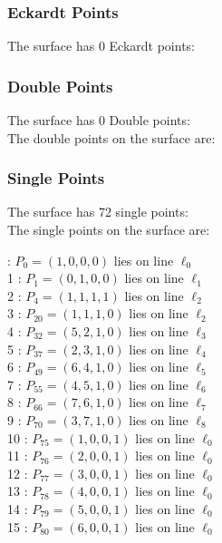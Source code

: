 \documentclass{article}
\begin{document}
{\subsubsection*{Eckardt Points}
The surface has 0 Eckardt points:\\
\subsubsection*{Double Points}
The surface has 0 Double points:\\
The double points on the surface are:\\
\begin{multicols}{2}
\noindent
\end{multicols}
\subsubsection*{Single Points}
The surface has 72 single points:\\
The single points on the surface are:\\
\begin{multicols}{2}
 : $P_{0}=( 1, 0, 0, 0 )$ lies on line $\ell_{0}$\\
1 : $P_{1}=( 0, 1, 0, 0 )$ lies on line $\ell_{1}$\\
2 : $P_{4}=( 1, 1, 1, 1 )$ lies on line $\ell_{2}$\\
3 : $P_{20}=( 1, 1, 1, 0 )$ lies on line $\ell_{2}$\\
4 : $P_{32}=( 5, 2, 1, 0 )$ lies on line $\ell_{3}$\\
5 : $P_{37}=( 2, 3, 1, 0 )$ lies on line $\ell_{4}$\\
6 : $P_{49}=( 6, 4, 1, 0 )$ lies on line $\ell_{5}$\\
7 : $P_{55}=( 4, 5, 1, 0 )$ lies on line $\ell_{6}$\\
8 : $P_{66}=( 7, 6, 1, 0 )$ lies on line $\ell_{7}$\\
9 : $P_{70}=( 3, 7, 1, 0 )$ lies on line $\ell_{8}$\\
10 : $P_{75}=( 1, 0, 0, 1 )$ lies on line $\ell_{0}$\\
11 : $P_{76}=( 2, 0, 0, 1 )$ lies on line $\ell_{0}$\\
12 : $P_{77}=( 3, 0, 0, 1 )$ lies on line $\ell_{0}$\\
13 : $P_{78}=( 4, 0, 0, 1 )$ lies on line $\ell_{0}$\\
14 : $P_{79}=( 5, 0, 0, 1 )$ lies on line $\ell_{0}$\\
15 : $P_{80}=( 6, 0, 0, 1 )$ lies on line $\ell_{0}$\\

\end{multicols}}
\end{document}
